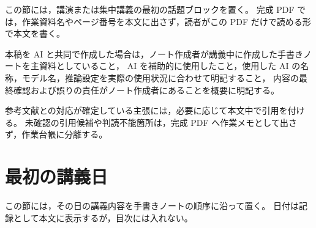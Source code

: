 
この節には，講演または集中講義の最初の話題ブロックを置く。
完成 PDF では，作業資料名やページ番号を本文に出さず，読者がこの PDF だけで読める形で本文を書く。

本稿を AI と共同で作成した場合は，ノート作成者が講義中に作成した手書きノートを主資料としていること，
AI を補助的に使用したこと，使用した AI の名称，モデル名，推論設定を実際の使用状況に合わせて明記すること，
内容の最終確認および誤りの責任がノート作成者にあることを概要に明記する。

参考文献との対応が確定している主張には，必要に応じて本文中で引用を付ける。
未確認の引用候補や判読不能箇所は，完成 PDF へ作業メモとして出さず，作業台帳に分離する。

\section{最初の講義日}

この節には，その日の講義内容を手書きノートの順序に沿って置く。
日付は記録として本文に表示するが，目次には入れない。
